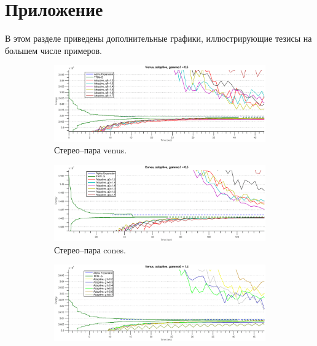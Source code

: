 \documentclass{article}
\begin{document}
\section{Приложение}
В этом разделе приведены дополнительные графики, иллюстрирующие тезисы на большем числе примеров.
\begin{figure}
    \centering
    \begin{subfigure}[t]{\textwidth}
            \centering
            \includegraphics[width=\textwidth]{adaptive_g0_venus}
            \caption{Стерео--пара venus.}
    \end{subfigure}
    \begin{subfigure}[t]{\textwidth}
            \centering
            \includegraphics[width=\textwidth]{adaptive_g0_cones}
            \caption{Стерео--пара cones.}
    \end{subfigure}
    \begin{subfigure}[t]{\textwidth}
            \centering
            \includegraphics[width=\textwidth]{adaptive_g1_venus}
    \end{subfigure}
    \begin{subfigure}[t]{\textwidth}

\end{subfigure}
\end{figure}
\end{document}
